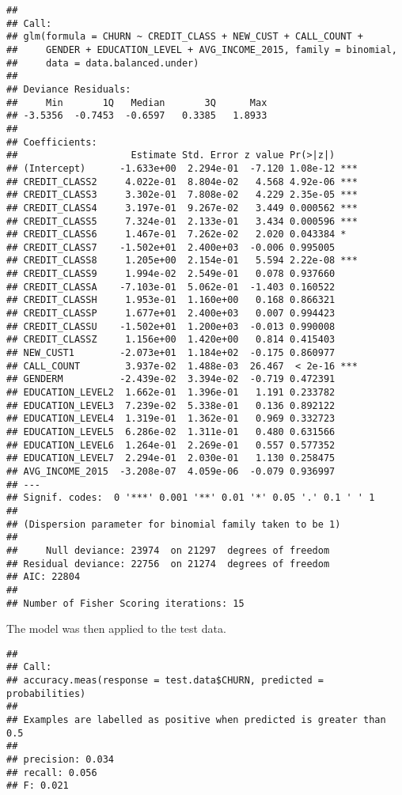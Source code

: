 \documentclass[]{article}
\begin{document}
\begin{verbatim}
## 
## Call:
## glm(formula = CHURN ~ CREDIT_CLASS + NEW_CUST + CALL_COUNT + 
##     GENDER + EDUCATION_LEVEL + AVG_INCOME_2015, family = binomial, 
##     data = data.balanced.under)
## 
## Deviance Residuals: 
##     Min       1Q   Median       3Q      Max  
## -3.5356  -0.7453  -0.6597   0.3385   1.8933  
## 
## Coefficients:
##                    Estimate Std. Error z value Pr(>|z|)    
## (Intercept)      -1.633e+00  2.294e-01  -7.120 1.08e-12 ***
## CREDIT_CLASS2     4.022e-01  8.804e-02   4.568 4.92e-06 ***
## CREDIT_CLASS3     3.302e-01  7.808e-02   4.229 2.35e-05 ***
## CREDIT_CLASS4     3.197e-01  9.267e-02   3.449 0.000562 ***
## CREDIT_CLASS5     7.324e-01  2.133e-01   3.434 0.000596 ***
## CREDIT_CLASS6     1.467e-01  7.262e-02   2.020 0.043384 *  
## CREDIT_CLASS7    -1.502e+01  2.400e+03  -0.006 0.995005    
## CREDIT_CLASS8     1.205e+00  2.154e-01   5.594 2.22e-08 ***
## CREDIT_CLASS9     1.994e-02  2.549e-01   0.078 0.937660    
## CREDIT_CLASSA    -7.103e-01  5.062e-01  -1.403 0.160522    
## CREDIT_CLASSH     1.953e-01  1.160e+00   0.168 0.866321    
## CREDIT_CLASSP     1.677e+01  2.400e+03   0.007 0.994423    
## CREDIT_CLASSU    -1.502e+01  1.200e+03  -0.013 0.990008    
## CREDIT_CLASSZ     1.156e+00  1.420e+00   0.814 0.415403    
## NEW_CUST1        -2.073e+01  1.184e+02  -0.175 0.860977    
## CALL_COUNT        3.937e-02  1.488e-03  26.467  < 2e-16 ***
## GENDERM          -2.439e-02  3.394e-02  -0.719 0.472391    
## EDUCATION_LEVEL2  1.662e-01  1.396e-01   1.191 0.233782    
## EDUCATION_LEVEL3  7.239e-02  5.338e-01   0.136 0.892122    
## EDUCATION_LEVEL4  1.319e-01  1.362e-01   0.969 0.332723    
## EDUCATION_LEVEL5  6.286e-02  1.311e-01   0.480 0.631566    
## EDUCATION_LEVEL6  1.264e-01  2.269e-01   0.557 0.577352    
## EDUCATION_LEVEL7  2.294e-01  2.030e-01   1.130 0.258475    
## AVG_INCOME_2015  -3.208e-07  4.059e-06  -0.079 0.936997    
## ---
## Signif. codes:  0 '***' 0.001 '**' 0.01 '*' 0.05 '.' 0.1 ' ' 1
## 
## (Dispersion parameter for binomial family taken to be 1)
## 
##     Null deviance: 23974  on 21297  degrees of freedom
## Residual deviance: 22756  on 21274  degrees of freedom
## AIC: 22804
## 
## Number of Fisher Scoring iterations: 15
\end{verbatim}

The model was then applied to the test data.

\begin{verbatim}
## 
## Call: 
## accuracy.meas(response = test.data$CHURN, predicted = probabilities)
## 
## Examples are labelled as positive when predicted is greater than 0.5 
## 
## precision: 0.034
## recall: 0.056
## F: 0.021
\end{verbatim}
\end{document}
